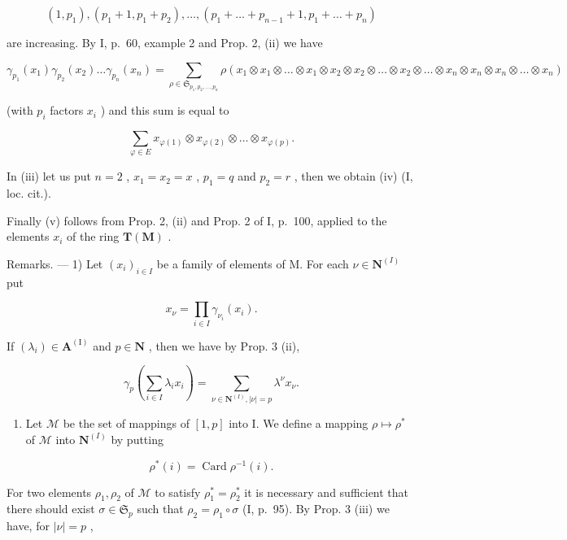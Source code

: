 \[
\left(1, p _ {1}\right), \left(p _ {1} + 1, p _ {1} + p _ {2}\right), \dots , \left(p _ {1} + \dots + p _ {n - 1} + 1, p _ {1} + \dots + p _ {n}\right)
\]

are increasing. By I, p.~60, example 2 and Prop. 2, (ii) we have

\[
\gamma_ {p _ {1}} \left(x _ {1}\right) \gamma_ {p _ {2}} \left(x _ {2}\right) \dots \gamma_ {p _ {n}} \left(x _ {n}\right) = \sum_ {\rho \in \mathfrak {S} _ {p _ {1}, p _ {2}, \dots , p _ {n}}} \rho \left(x _ {1} \otimes x _ {1} \otimes \dots \otimes x _ {1} \otimes x _ {2} \otimes x _ {2} \otimes \dots \otimes x _ {2} \otimes \dots \otimes x _ {n} \otimes x _ {n} \otimes x _ {n} \otimes \dots \otimes x _ {n}\right)
\]

(with \(p_i\) factors \(x_i\) ) and this sum is equal to

\[
\sum_ {\varphi \in E} x _ {\varphi (1)} \otimes x _ {\varphi (2)} \otimes \dots \otimes x _ {\varphi (p)}.
\]

In (iii) let us put \(n = 2\) , \(x_{1} = x_{2} = x\) , \(p_{1} = q\) and \(p_{2} = r\) , then we obtain (iv) (I, loc. cit.).

Finally (v) follows from Prop. 2, (ii) and Prop. 2 of I, p.~100, applied to the elements \(x_{i}\) of the ring \(\mathbf{T}(\mathbf{M})\) .

Remarks. --- 1) Let \((x_{i})_{i\in I}\) be a family of elements of M. For each \(\nu \in \mathbf{N}^{(I)}\) put

\[
x _ {\nu} = \prod_ {i \in I} \gamma_ {\nu_ {i}} (x _ {i}).
\]

If \((\lambda_{i})\in \mathbf{A}^{(\mathrm{I})}\) and \(p\in \mathbf{N}\) , then we have by Prop. 3 (ii),

\[
\gamma_ {p} \left(\sum_ {i \in I} \lambda_ {i} x _ {i}\right) = \sum_ {\nu \in \mathbf {N} ^ {(I)}, | \nu | = p} \lambda^ {\nu} x _ {\nu}.\tag{6}
\]

\begin{enumerate}
\def\labelenumi{\arabic{enumi})}
\setcounter{enumi}{1}
\tightlist
\item
  Let \(\mathcal{M}\) be the set of mappings of \([1, p]\) into I. We define a mapping \(\rho \mapsto \rho^{*}\) of \(\mathcal{M}\) into \(\mathbf{N}^{(I)}\) by putting
\end{enumerate}

\[
\rho^ {*} (i) = \operatorname{Card} \rho^ {- 1} (i).
\]

For two elements \(\rho_1, \rho_2\) of \(\mathcal{M}\) to satisfy \(\rho_1^* = \rho_2^*\) it is necessary and sufficient that there should exist \(\sigma \in \mathfrak{S}_p\) such that \(\rho_2 = \rho_1 \circ \sigma\) (I, p.~95). By Prop. 3 (iii) we have, for \(|\nu| = p\) ,

